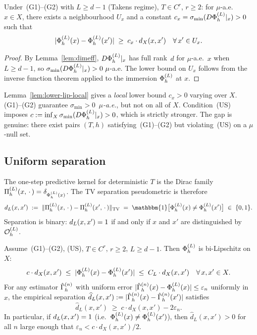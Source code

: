 \begin{lemma}
\label{lem:lower-lip-local}
Under~(G1)--(G2) with $L \geq d-1$ (Takens regime), $T \in C^r$, $r \geq 2$:
for $\mu$-a.e.\ $x \in X$, there exists a neighbourhood $U_x$ and a constant
$c_x = \sigma_{\min}(D\Phi_h^{(L)}|_x) > 0$ such that
\[
  |\Phi_h^{(L)}(x) - \Phi_h^{(L)}(x')| \;\geq\; c_x \cdot d_X(x,x')
  \quad\forall\, x' \in U_x.
\]
\end{lemma}

\begin{proof}
By Lemma~\ref{lem:dimeff}, $D\Phi_h^{(L)}|_x$ has full rank~$d$ for $\mu$-a.e.\ $x$
when $L \geq d-1$, so $\sigma_{\min}(D\Phi_h^{(L)}|_x) > 0~\mu$-a.e.
The lower bound on $U_x$ follows from the inverse function theorem applied to
the immersion $\Phi_h^{(L)}$ at $x$.
\end{proof}

\begin{remark}
Lemma~\ref{lem:lower-lip-local} gives a \emph{local} lower bound $c_x > 0$
varying over $X$.
(G1)--(G2) guarantee $\sigma_{\min} > 0$~\emph{$\mu$-a.e.}, but not on all of $X$.
Condition~(US) imposes $c := \inf_X \sigma_{\min}(D\Phi_h^{(L)}|_x) > 0$, which is
strictly stronger.
The gap is genuine: there exist pairs $(T,h)$ satisfying~(G1)--(G2) but
violating~(US) on a $\mu$-null set.
\end{remark}

\subsection{Uniform separation}

The one-step predictive kernel for deterministic $T$ is the Dirac family
$\Pi_h^{(L)}(x,\,\cdot\,) = \delta_{\Phi_h^{(L)}(x)}$.
The TV separation pseudometric is therefore
\[
  \preddisc{L}(x,x')
  \;:=\;
  \|\PihL(x,\,\cdot\,) - \PihL(x',\,\cdot\,)\|_{\mathrm{TV}}
  \;=\;
  \mathbbm{1}\bigl[\PhiL(x) \neq \PhiL(x')\bigr]
  \;\in\; \{0,1\}.
\]
Separation is binary: $d_{L}(x,x') = 1$ if and only if
$x$ and $x'$ are distinguished by $\mathcal{O}_h^{(L)}$.

\begin{theorem}
\label{thm:sep-stable}
Assume~(G1)--(G2), (US), $T \in C^r$, $r \geq 2$, $L \geq d-1$.
Then $\Phi_h^{(L)}$ is bi-Lipschitz on $X$:
\[
  c \cdot d_X(x,x') \;\leq\; |\Phi_h^{(L)}(x) - \Phi_h^{(L)}(x')| \;\leq\; C_L \cdot d_X(x,x')
  \quad\forall\, x, x' \in X.
\]
For any estimator $\hat{\Gamma}_h^{(n)}$ with uniform error
$|\hat{\Gamma}_h^{(n)}(x) - \Phi_h^{(L)}(x)| \leq \varepsilon_n$ uniformly in $x$, the
empirical separation $\widehat{d}_L(x,x') := |\hat{\Gamma}_h^{(n)}(x) - \hat{\Gamma}_h^{(n)}(x')|$
satisfies
\[
  \widehat{d}_L(x,x') \;\geq\; c \cdot d_X(x,x') - 2\varepsilon_n.
\]
In particular, if $d_{L}(x,x') = 1$ (i.e.\ $\Phi_h^{(L)}(x) \neq \Phi_h^{(L)}(x')$),
then $\widehat{d}_L(x,x') > 0$ for all $n$ large enough that
$\varepsilon_n < c \cdot d_X(x,x') / 2$.
\end{theorem}

